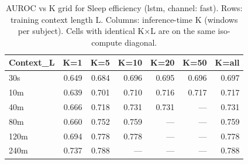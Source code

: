 \begin{table}[ht]
\centering
\caption{AUROC vs K grid for Sleep efficiency (lstm, channel: fast). Rows: training context length L. Columns: inference-time K (windows per subject). Cells with identical K×L are on the same iso-compute diagonal.}
\label{tab:kgrid_sleep_efficiency_binary_lstm_fast}
\begin{tabular}{lrrrrrr}
\toprule
Context_L & K=1 & K=5 & K=10 & K=20 & K=50 & K=all \\
\midrule
30s & 0.649 & 0.684 & 0.696 & 0.695 & 0.696 & 0.697 \\
10m & 0.639 & 0.701 & 0.710 & 0.716 & 0.717 & 0.717 \\
40m & 0.666 & 0.718 & 0.731 & 0.731 & — & 0.731 \\
80m & 0.660 & 0.752 & 0.759 & — & — & 0.759 \\
120m & 0.694 & 0.778 & 0.778 & — & — & 0.778 \\
240m & 0.737 & 0.788 & — & — & — & 0.788 \\
\bottomrule
\end{tabular}
\end{table}